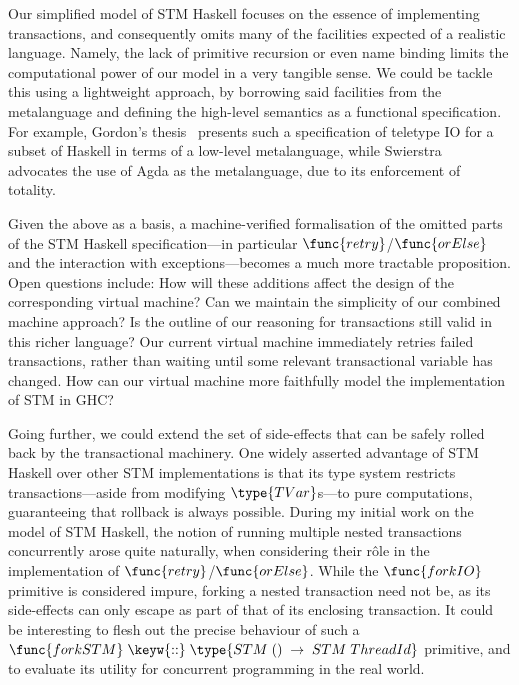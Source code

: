 Our simplified model of STM Haskell focuses on the essence of implementing
transactions, and consequently omits many of the facilities expected of
a realistic language. Namely, the lack of primitive recursion or even name
binding limits the computational power of our model in a very tangible
sense. We could be tackle this using a lightweight approach, by borrowing
said facilities from the metalanguage and defining the high-level semantics
as a functional specification. For example, Gordon's
thesis~\cite{gordon92-fpio} presents such a specification of teletype IO for
a subset of Haskell in terms of a low-level metalanguage, while
Swierstra~\cite{swierstra08-funspec} advocates the use of Agda as the
metalanguage, due to its enforcement of totality.

Given the above as a basis, a machine-verified formalisation of the omitted
parts of the STM Haskell specification---in particular
$\func{retry}$/$\func{orElse}$ and the interaction with exceptions---becomes
a much more tractable proposition. Open questions include: How will these
additions affect the design of the corresponding virtual machine? Can we
maintain the simplicity of our combined machine approach? Is the outline of
our reasoning for transactions still valid in this richer language? Our
current virtual machine immediately retries failed transactions, rather than
waiting until some relevant transactional variable has changed. How can our
virtual machine more faithfully model the implementation of STM in GHC?

Going further, we could extend the set of side-effects that can be safely
rolled back by the transactional machinery. One widely asserted advantage of
STM Haskell over other STM implementations is that its type system restricts
transactions---aside from modifying $\type{TVar}$s---to pure computations,
guaranteeing that rollback is always possible. During my initial work on the
model of STM Haskell, the notion of running multiple nested transactions
concurrently arose quite naturally, when considering their r\^{o}le in the
implementation of $\func{retry}$/$\func{orElse}$. While the $\func{forkIO}$
primitive is considered impure, forking a nested transaction need not be, as
its side-effects can only escape as part of that of its enclosing
transaction. It could be interesting to flesh out the precise behaviour of
such
a $\func{forkSTM}\;\keyw{::}\;\type{STM\;()\;\rightarrow\;STM\;ThreadId}$
primitive, and to evaluate its utility for concurrent programming in the
real world.





